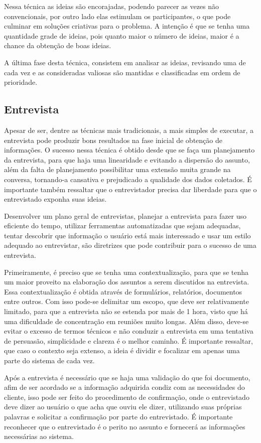   Nessa técnica as ideias são encorajadas, podendo parecer as vezes não convencionais,
por outro lado elas estimulam os participantes, o que pode culminar em soluções criativas para o problema.
A intenção é que se tenha uma quantidade grade de ideias, pois quanto maior o número de ideias,
maior é a chance da obtenção de boas ideias.

  A última fase desta técnica, consistem em analisar as ideias,
revisando uma de cada vez e as consideradas valiosas são mantidas e classificadas em ordem de prioridade.

\subsection{Entrevista}
  Apesar de ser, dentre as técnicas mais tradicionais, a mais simples de executar,
a entrevista pode produzir bons resultados na fase inicial de obtenção de informações.
O sucesso nessa técnica é obtido desde que se faça um planejamento da entrevista,
para que haja uma linearidade e evitando a dispersão do assunto, além da falta de planejamento
possibilitar uma extensão muita grande na conversa, tornando-a cansativa e prejudicado a qualidade
dos dados coletados. É importante também ressaltar que o entrevistador precisa dar liberdade para que o
entrevistado exponha suas ideias.

  Desenvolver um plano geral de entrevistas, planejar a entrevista para fazer uso eficiente do tempo,
utilizar ferramentas automatizadas que sejam adequadas, tentar descobrir que informação o usuário está mais
interessado e usar um estilo adequado ao entrevistar, são diretrizes que pode contribuir para o sucesso de
uma entrevista.

  Primeiramente, é preciso que se tenha uma contextualização, para que se tenha um maior proveito na elaboração
dos assuntos a serem discutidos na entrevista. Essa contextualização é obtida através de formulários,
relatórios, documentos entre outros. Com isso pode-se delimitar um escopo, que deve ser relativamente limitado,
para que a entrevista não se estenda por mais de 1 hora, visto que há uma dificuldade de concentração em reuniões
muito longas. Além disso, deve-se evitar o excesso de termos técnicos e não conduzir a entrevista em uma tentativa
de persuasão, simplicidade e clareza é o melhor caminho. É importante ressaltar, que caso o contexto seja extenso,
a ideia é dividir e focalizar em apenas uma parte do sistema de cada vez.

  Após a entrevista é necessário que se haja uma validação do que foi documento, afim de ser acordado se a
informação adquirida condiz com as necessidades do cliente, isso pode ser feito do procedimento de confirmação,
onde o entrevistado deve dizer ao usuário o que acha que ouviu ele dizer, utilizando suas próprias palavras e
solicitar a confirmação por parte do entrevistado. É importante reconhecer que o entrevistado é o
perito no assunto e fornecerá as informações necessárias ao sistema.

